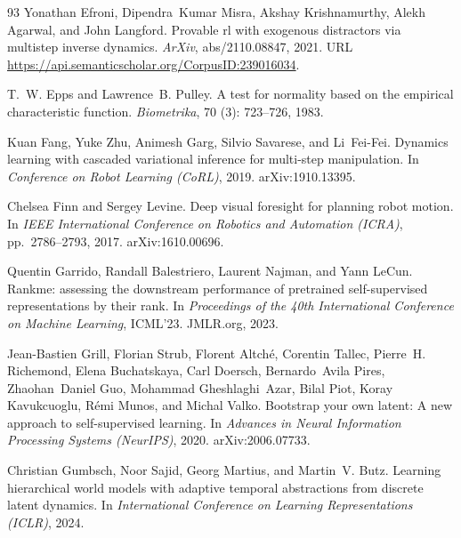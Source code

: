 \begin{thebibliography}{93}
Yonathan Efroni, Dipendra~Kumar Misra, Akshay Krishnamurthy, Alekh Agarwal, and
  John Langford.
\newblock Provable rl with exogenous distractors via multistep inverse
  dynamics.
\newblock \emph{ArXiv}, abs/2110.08847, 2021.
\newblock URL \url{https://api.semanticscholar.org/CorpusID:239016034}.

T.~W. Epps and Lawrence~B. Pulley.
\newblock A test for normality based on the empirical characteristic function.
\newblock \emph{Biometrika}, 70 (3): 723--726, 1983.

Kuan Fang, Yuke Zhu, Animesh Garg, Silvio Savarese, and Li~Fei-Fei.
\newblock Dynamics learning with cascaded variational inference for multi-step
  manipulation.
\newblock In \emph{Conference on Robot Learning (CoRL)}, 2019.
\newblock arXiv:1910.13395.

Chelsea Finn and Sergey Levine.
\newblock Deep visual foresight for planning robot motion.
\newblock In \emph{IEEE International Conference on Robotics and Automation
  (ICRA)}, pp.\  2786--2793, 2017.
\newblock arXiv:1610.00696.

Quentin Garrido, Randall Balestriero, Laurent Najman, and Yann LeCun.
\newblock Rankme: assessing the downstream performance of pretrained
  self-supervised representations by their rank.
\newblock In \emph{Proceedings of the 40th International Conference on Machine
  Learning}, ICML'23. JMLR.org, 2023.

Jean-Bastien Grill, Florian Strub, Florent Altch{\'e}, Corentin Tallec,
  Pierre~H. Richemond, Elena Buchatskaya, Carl Doersch, Bernardo~Avila Pires,
  Zhaohan~Daniel Guo, Mohammad Gheshlaghi~Azar, Bilal Piot, Koray Kavukcuoglu,
  R{\'e}mi Munos, and Michal Valko.
\newblock Bootstrap your own latent: A new approach to self-supervised
  learning.
\newblock In \emph{Advances in Neural Information Processing Systems
  (NeurIPS)}, 2020.
\newblock arXiv:2006.07733.

Christian Gumbsch, Noor Sajid, Georg Martius, and Martin~V. Butz.
\newblock Learning hierarchical world models with adaptive temporal
  abstractions from discrete latent dynamics.
\newblock In \emph{International Conference on Learning Representations
  (ICLR)}, 2024.


\end{thebibliography}
